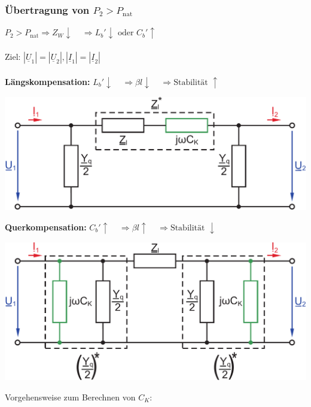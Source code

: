 \documentclass[a4paper,twocolumn,10pt]{article}
\begin{document}
\subsubsection{Übertragung von $P_2>P_{\text{nat}}$}
$P_2>P_{\text{nat}}\Rightarrow Z_W\downarrow\;\;\;\;\Rightarrow L_b'\downarrow\text{ oder }C_b'\uparrow$\\\\
Ziel: $|\underline{U}_1|=|\underline{U}_2|,|\underline{I}_1|=|\underline{I}_2|$\\\\
\textbf{Längskompensation:} $L_b'\downarrow\;\;\;\;\Rightarrow\beta l\downarrow\;\;\;\;\Rightarrow\text{Stabilität }\uparrow$
\begin{center}
\includegraphics[width=0.98\columnwidth]{Grafiken/Laengskompensation_2}
\end{center}
\vspace{0.3cm}
\textbf{Querkompensation:} $C_b'\uparrow\;\;\;\;\Rightarrow\beta l\uparrow\;\;\;\;\Rightarrow\text{Stabilität }\downarrow$
\begin{center}
\includegraphics[width=0.98\columnwidth]{Grafiken/Querkompensation_2}
\end{center}
Vorgehensweise zum Berechnen von $C_K$:
\end{document}
